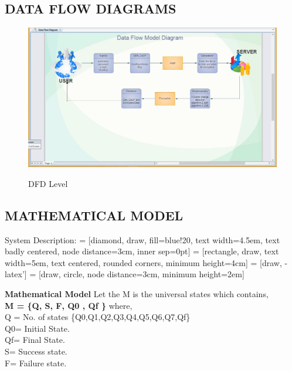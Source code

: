 \documentclass[12pt]{extreport}
\begin{document}
     \subsection{DATA FLOW DIAGRAMS}
     
    \begin{figure}[H]
  \includegraphics[scale=.45]{DFD.jpg}\\
  \caption{DFD Level}
  
\end{figure}

     \pagebreak
     \subsection{MATHEMATICAL MODEL}System Description:\newline
 = [diamond, draw, fill=blue!20, 
    text width=4.5em, text badly centered, node distance=3cm, inner sep=0pt]
 = [rectangle, draw, text width=5em, text centered, rounded corners, minimum height=4cm]
 = [draw, -latex']
 = [draw, circle, node distance=3cm,
    minimum height=2em]
    
    \textbf{Mathematical Model}\newline
    	       Let the M is the universal states which contains, \\
    \textbf{M = \{Q, S, F, Q0 , Qf \}} \newline
    where, \\
    		Q = No. of states \{Q0,Q1,Q2,Q3,Q4,Q5,Q6,Q7,Qf\}\\
    		Q0= Initial State.\\
    		Qf= Final State.\\
    		S= Success state.\\
    		F= Failure state.\\
    		\newline
		
\end{document}
